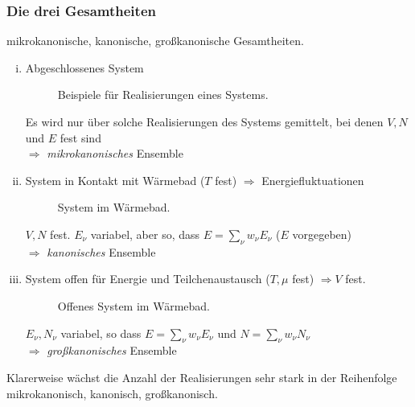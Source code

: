 \subsubsection{Die drei Gesamtheiten}
mikrokanonische, kanonische, großkanonische Gesamtheiten.
\begin{enumerate}[i)]
    \item Abgeschlossenes System
    \begin{figure}[H]
        \centering
        \def\svgwidth{0.9\textwidth}
        
        \caption{Beispiele für Realisierungen eines Systems.}
        \label{img:realisationsMKE}
    \end{figure}
    Es wird nur über solche Realisierungen des Systems gemittelt, bei denen $V, N$ und $E$ fest sind \\
    $\Rightarrow$ \emph{mikrokanonisches} Ensemble
    \item System in Kontakt mit Wärmebad ($T$ fest) $\Rightarrow$ Energiefluktuationen
    \begin{figure}[H]
        \centering
        \def\svgwidth{0.5\textwidth}
        
        \caption{System im Wärmebad.}
        \label{img:systemInHeatBath}
    \end{figure}
    $V, N$ fest. $E_\nu$ variabel, aber so, dass $E=\sum_\nu w_\nu E_\nu$ ($E$ vorgegeben) \\
    $\Rightarrow$ \emph{kanonisches} Ensemble
    \item System offen für Energie und Teilchenaustausch ($T, \mu$ fest) $\Rightarrow V$ fest.
    \begin{figure}[H]
        \centering
        \def\svgwidth{0.5\textwidth}
        
        \caption{Offenes System im Wärmebad.}
        \label{img:OpenSystemInHeatBath}
    \end{figure}
    $E_\nu, N_\nu$ variabel, so dass $E=\sum_\nu w_\nu E_\nu$ und $N=\sum_\nu w_\nu N_\nu$ \\
    $\Rightarrow$ \emph{großkanonisches} Ensemble
\end{enumerate}
Klarerweise wächst die Anzahl der Realisierungen sehr stark in der Reihenfolge mikrokanonisch, kanonisch, großkanonisch.

